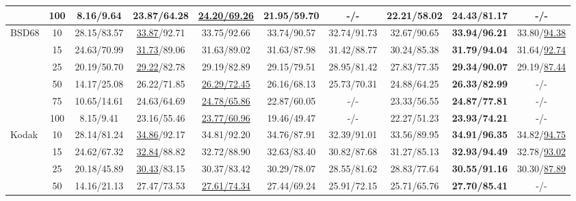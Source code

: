 \documentclass[10pt,journal,compsoc]{IEEEtran}
\newcommand\bdr[1]{{\textbf{#1}}}
\newcommand\bdb[1]{{\underline{#1}}}
\begin{document}
\begin{table*}[t!]
\begin{scriptsize}
\begin{center}
\begin{tabular}{l c c ccccccc}
& 100 &  8.16/9.64  & 23.87/64.28 & \bdb{24.20/69.26} & 21.95/59.70 & -/- & 22.21/58.02 & \bdr{24.43/81.17} & -/- \\

\hline


\multirow{6}{*}{BSD68}

& 10  & 28.15/83.57 & \bdb{33.87}/92.71 & 33.75/92.66 & 33.74/90.57 & 32.74/91.73 & 32.67/90.65 & \bdr{33.94/96.21} & 33.80/\bdb{94.38}\\

& 15  & 24.63/70.99 & \bdb{31.73}/89.06 & 31.63/89.02 & 31.63/87.98 & 31.42/88.77 & 30.24/85.38 & \bdr{31.79/94.04} & 31.64/\bdb{92.74}\\

& 25  & 20.19/50.70 & \bdb{29.22}/82.78 & 29.19/82.89 & 29.15/79.51 & 28.95/81.42 & 27.83/77.35 & \bdr{29.34/90.07} & 29.19/\bdb{87.44}\\

& 50  & 14.17/25.08 & 26.22/71.85 & \bdb{26.29/72.45} & 26.16/68.13 & 25.73/70.31 & 24.88/64.25 & \bdr{26.33/82.99} & -/- \\

& 75  & 10.65/14.61 & 24.63/64.69 & \bdb{24.78/65.86} & 22.87/60.05 & -/- & 23.33/56.55 & \bdr{24.87/77.81} & -/- \\

& 100 & 8.15/9.41   & 23.16/55.46 & \bdb{23.77/60.96} & 19.46/49.47 & -/- & 22.27/51.23 & \bdr{23.93/74.21} & -/- \\

\hline


\multirow{6}{*}{Kodak}

& 10  & 28.14/81.24 & \bdb{34.86}/92.17 & 34.81/92.20 & 34.76/87.91 & 32.39/91.01 & 33.56/89.95 & \bdr{34.91/96.35} & 34.82/\bdb{94.75}\\

& 15  & 24.62/67.32 & \bdb{32.84}/88.82 & 32.72/88.90 & 32.63/83.40 & 30.82/87.68 & 31.27/85.13 & \bdr{32.93/94.49} & 32.78/\bdb{93.02}\\

& 25  & 20.18/45.89 & \bdb{30.43}/83.15 & 30.37/83.42 & 30.29/78.07 & 28.55/81.62 & 28.83/77.64 & \bdr{30.55/91.16} & 30.30/\bdb{87.89}\\

& 50  & 14.16/21.13 & 27.47/73.53 & \bdb{27.61/74.34} & 27.44/69.24 & 25.91/72.15 & 25.71/65.76 & \bdr{27.70/85.41} & -/- \\


\end{tabular}
\end{center}
\end{scriptsize}
\end{table*}
\end{document}
